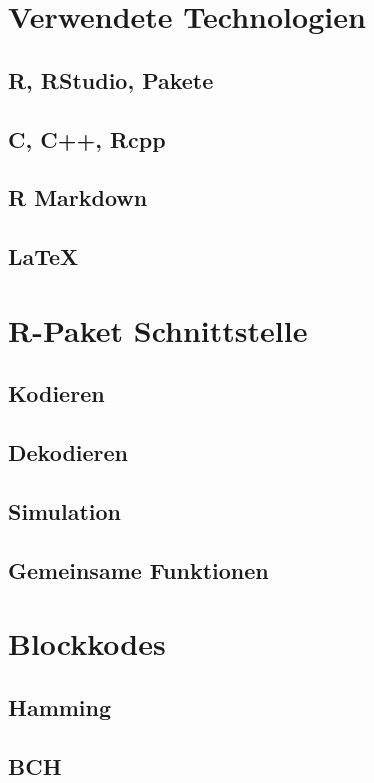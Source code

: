 
\section{Verwendete Technologien}
\label{section:technologies}

\subsection{R, RStudio, Pakete}
\subsection{C, C++, Rcpp}
\subsection{R Markdown}
\subsection{\LaTeX}


\section{R-Paket Schnittstelle}
\label{section:interface}


\subsection{Kodieren}
\label{sec:interface_encode}


\subsection{Dekodieren}
\label{sec:interface_decode}


\subsection{Simulation}
\label{sec:interface_simulation}


\subsection{Gemeinsame Funktionen}
\label{sec:interface_applynoise}


\section{Blockkodes}
\label{section:impl_block}

\subsection{Hamming}
\subsection{BCH}



